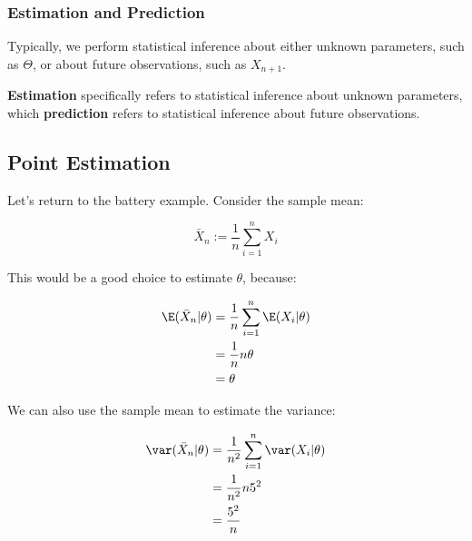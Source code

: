 \documentclass[a4paper]{article}
\begin{document}
            \subsubsection{Estimation and Prediction}
                Typically, we perform statistical inference about either unknown
                parameters, such as $\Theta$, or about future observations, such
                as $X_{n+1}$.

                \begin{definition}
                    \textbf{Estimation} specifically refers to statistical
                    inference about unknown parameters, which
                    \textbf{prediction} refers to statistical inference about
                    future observations.
                \end{definition}

        \subsection{Point Estimation}
            \begin{fread}
                [MR03, section 7.2]
            \end{fread}

            Let's return to the battery example. Consider the sample mean:

            \[
                \bar X_n := \frac{1}{n} \sum_{i=1}^n X_i
            \]

            This would be a good choice to estimate $\theta$, because:

            \begin{align*}
                \E(\bar X_n | \theta) & = \frac{1}{n} \sum_{i = 1}^n \E(X_i |
                    \theta) \\
                & = \frac{1}{n}n\theta \\
                & = \theta
            \end{align*}

            We can also use the sample mean to estimate the variance:

            \begin{align*}
                \var(\bar X_n | \theta) & = \frac{1}{n^2} \sum_{i = 1}^n
                    \var(X_i | \theta) \\
                & = \frac{1}{n^2} n 5^2 \\
                & = \frac{5^2}{n}
            \end{align*}
\end{document}
